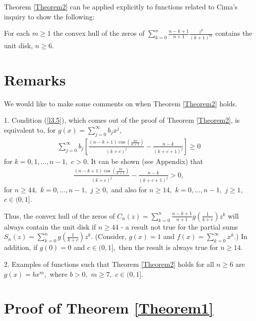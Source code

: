 \documentclass[final]{siamltex}
\begin{document}
Theorem \ref{Theorem2} can be applied explicitly to functions related to Cima's inquiry to show the following:

\begin{corollary} For each $m \geq 1$ the convex hull of the zeros of $\sum_{k=0}^{n} \frac{n-k+1}{n+1} \frac{z^{k}}{(k+1)^{m}}$ contains the unit disk,  $n \geq 6.$
\end{corollary}

 \section{Remarks}
  
 We would like to make some comments on when Theorem \ref{Theorem2} holds.

 1. Condition (\ref{l3.5}), which comes out of the proof of Theorem \ref{Theorem2},  is equivalent to, for $g(x) = \sum_{j=0}^{\infty}b_{j}x^{j},$   \begin{eqnarray*} \sum_{j=0}^{\infty} b_{j} \left[ \frac{ (n-k+1) \cos \left( \frac{3 \pi}{n+1} \right) }{ (k+c)^{j} } - \frac{n-k}{(k+c+1)^{j}} \right] \geq 0 
  \end{eqnarray*} 
  for  $ k = 0, 1, \ldots, n-1,$ $ c > 0.$ It can be shown (see Appendix) that 
 \begin{eqnarray*} \frac{ (n-k+1) \cos \left( \frac{3 \pi}{n+1} \right) }{ (k+c)^{j} } - \frac{n-k}{(k+c+1)^{j}} > 0, 
 \end{eqnarray*}
 for $n \geq 44,$ $k = 0, \ldots, n-1,$ $j \geq 0,$ and also for $n \geq 14,$ $k = 0, \ldots, n-1,$ $j \geq 1,$ $c \in (0,1].$
 

Thus, the convex hull of the zeros of $C_{n}(z) = \sum_{k=0}^{n} \frac{n-k+1}{n+1} g \left( \frac{1}{k+c} \right) z^{k}$ will always contain the unit disk if $n \geq 44$ -  a result not true for the partial sums $S_{n}(z) = \sum_{k=0}^{n} g \left( \frac{1}{k+c} \right) z^{k}.$ (Consider, $g(x) = 1$ and $f(x) = \sum_{k=0}^{\infty}x^{k}$.)  In addition, if $g(0) = 0$ and $c \in (0,1],$ then the result is always true for $n \geq 14.$  
 
 \vspace {4 pt}

 2. Examples of functions such that Theorem \ref{Theorem2} holds for all $n \geq 6$ are $g(x) = bx^{m},$ where $b > 0,$ $m \geq 7,$ $c \in (0,1].$ 


\section{Proof of Theorem \ref{Theorem1}}
\end{document}
